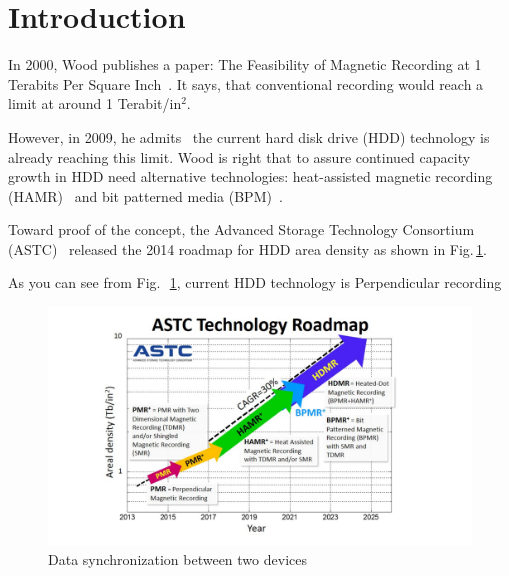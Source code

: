 \section{Introduction}
In 2000, Wood publishes a paper: The Feasibility of Magnetic Recording at 1 Terabits Per Square Inch~\cite{Wood2000}. It says, that conventional recording would reach a limit at around 1 Terabit/in$^2$.

However, in 2009, he admits~\cite{Wood2009} the current hard disk drive (HDD) technology is already reaching this limit. Wood is right that to assure continued capacity growth in HDD need alternative technologies: heat-assisted magnetic recording (HAMR)~\cite{Rottmeyer} and bit patterned media (BPM)~\cite{Terris}. 

Toward proof of the concept, the Advanced Storage Technology Consortium (ASTC)~\cite{ASTC} released the 2014 roadmap for HDD area density as shown in Fig.\,\ref{fig_astc}.

As you can see from Fig.~\,\ref{fig_astc}, current HDD technology is Perpendicular recording\

\begin{figure}[!hbt]
\includegraphics[height=0.25\textheight]{ASTC}
\caption{Data synchronization between two devices}
\label{fig_astc}
\end{figure}